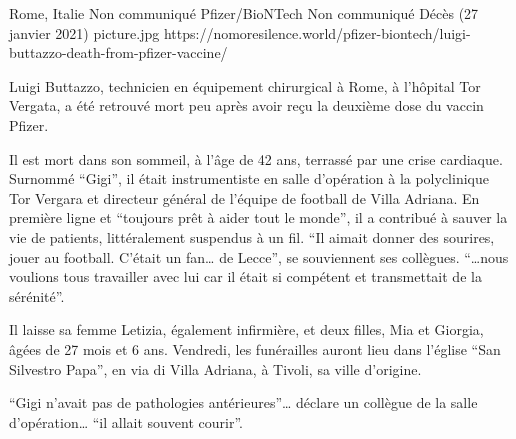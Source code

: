 {Rome, Italie}
{Non communiqué}
{Pfizer/BioNTech}
{Non communiqué}
{Décès (27 janvier 2021)}
{picture.jpg}
{https://nomoresilence.world/pfizer-biontech/luigi-buttazzo-death-from-pfizer-vaccine/}
{

Luigi Buttazzo, technicien en équipement chirurgical à Rome, à l'hôpital Tor
Vergata, a été retrouvé mort peu après avoir reçu la deuxième dose du vaccin
Pfizer.

Il est mort dans son sommeil, à l'âge de 42 ans, terrassé par une crise
cardiaque. Surnommé “Gigi”, il était instrumentiste en salle d'opération à la
polyclinique Tor Vergara et directeur général de l'équipe de football de Villa
Adriana. En première ligne et “toujours prêt à aider tout le monde”, il a
contribué à sauver la vie de patients, littéralement suspendus à un fil. “Il
aimait donner des sourires, jouer au football. C'était un fan… de Lecce”, se
souviennent ses collègues. “…nous voulions tous travailler avec lui car il était
si compétent et transmettait de la sérénité”.

Il laisse sa femme Letizia, également infirmière, et deux filles, Mia et
Giorgia, âgées de 27 mois et 6 ans. Vendredi, les funérailles auront lieu dans
l'église “San Silvestro Papa”, en via di Villa Adriana, à Tivoli, sa ville
d'origine.

“Gigi n'avait pas de pathologies antérieures”… déclare un collègue de la salle
d'opération… “il allait souvent courir”.

}
